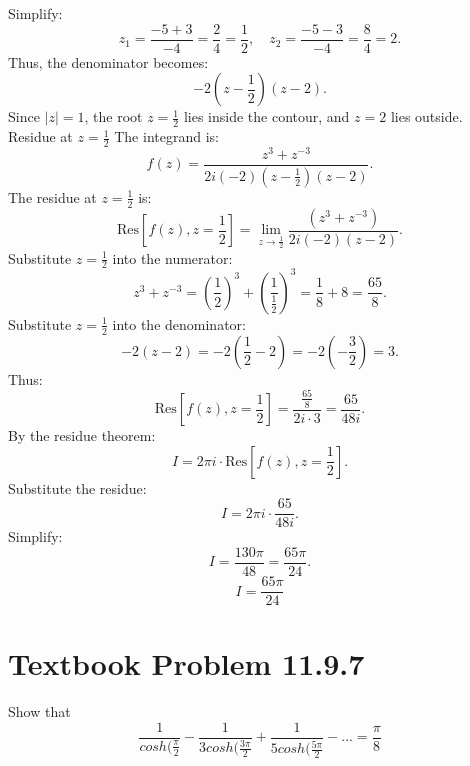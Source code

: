 \documentclass[12pt]{article}
\begin{document}
        Simplify:
        \[
        z_1 = \frac{-5 + 3}{-4} = \frac{2}{4} = \frac{1}{2}, \quad z_2 = \frac{-5 - 3}{-4} = \frac{8}{4} = 2.
        \]
        Thus, the denominator becomes:
        \[
        -2(z - \frac{1}{2})(z - 2).
        \]
        Since \(|z| = 1\), the root \(z = \frac{1}{2}\) lies inside the contour, and \(z = 2\) lies outside.
        Residue at \(z = \frac{1}{2}\)
        The integrand is:
        \[
        f(z) = \frac{z^3 + z^{-3}}{2i(-2)(z - \frac{1}{2})(z - 2)}.
        \]
        The residue at \(z = \frac{1}{2}\) is:
        \[
        \text{Res}\left[f(z), z = \frac{1}{2}\right] = \lim_{z \to \frac{1}{2}} \frac{(z^3 + z^{-3})}{2i(-2)(z - 2)}.
        \]
        Substitute \(z = \frac{1}{2}\) into the numerator:
        \[
        z^3 + z^{-3} = \left(\frac{1}{2}\right)^3 + \left(\frac{1}{\frac{1}{2}}\right)^3 = \frac{1}{8} + 8 = \frac{65}{8}.
        \]
        Substitute \(z = \frac{1}{2}\) into the denominator:
        \[
        -2(z - 2) = -2\left(\frac{1}{2} - 2\right) = -2\left(-\frac{3}{2}\right) = 3.
        \]
        Thus:
        \[
        \text{Res}\left[f(z), z = \frac{1}{2}\right] = \frac{\frac{65}{8}}{2i \cdot 3} = \frac{65}{48i}.
        \]
        By the residue theorem:
        \[
        I = 2\pi i \cdot \text{Res}\left[f(z), z = \frac{1}{2}\right].
        \]
        Substitute the residue:
        \[
        I = 2\pi i \cdot \frac{65}{48i}.
        \]
        Simplify:
        \[
        I = \frac{130\pi}{48} = \frac{65\pi}{24}.
        \]
        \[
        \boxed{I = \frac{65\pi}{24}}
        \]

\section*{Textbook Problem 11.9.7}
    Show that 
    \[
        \frac{1}{cosh(\frac{\pi}{2}} - \frac{1}{3 cosh(\frac{3 \pi}{2}} + \frac{1}{5 cosh(\frac{5 \pi}{2}} - ... = \frac{\pi}{8}
    \]
\end{document}
